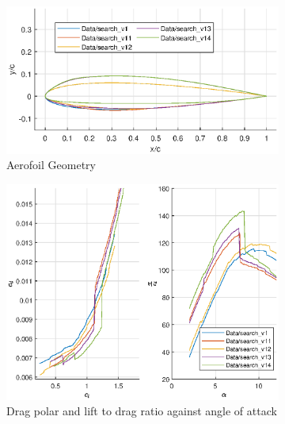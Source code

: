 \documentclass{article}
\begin{document}
\begin{figure}[H]
    \begin{subfigure}{0.54\textwidth}
        \centering
        \includegraphics[width=1.2\textwidth, center]{figures/hiRe_geometry_14.eps}
        \caption{Aerofoil Geometry}
        \label{fig:v14_geometry}
    \end{subfigure}
    \begin{subfigure}{0.45\textwidth}
        \centering
        \includegraphics[width=1.2\textwidth, center]{figures/hiRe_lod_14.eps}
        \caption{Drag polar and lift to drag ratio against angle of attack}
        \label{fig:v14_lod}
    \end{subfigure}
    \caption{}
\end{figure}
\end{document}
